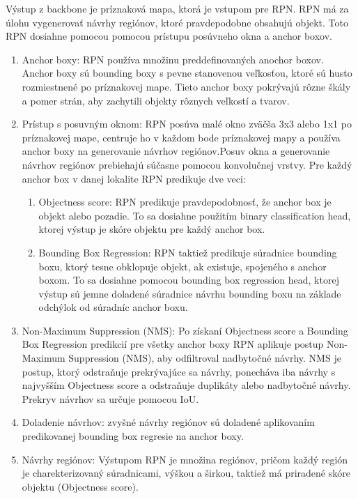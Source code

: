 Výstup z backbone je príznaková mapa, ktorá je vstupom pre RPN. RPN má za úlohu vygenerovať návrhy regiónov, ktoré pravdepodobne obsahujú objekt. Toto RPN dosiahne pomocou pomocou prístupu posúvneho okna a anchor boxov.
\begin{enumerate}
  \item Anchor boxy: RPN používa množinu preddefinovaných anochor boxov. Anchor boxy sú bounding boxy s pevne stanovenou veľkosťou, ktoré sú husto rozmiestnené po príznakovej mape. Tieto anchor boxy pokrývajú rôzne škály a pomer strán, aby zachytili objekty rôznych veľkostí a tvarov. 
  \item Prístup s posuvným oknom: RPN posúva malé okno zväčša 3x3 alebo 1x1 po príznakovej mape, centruje ho v každom bode príznakovej mapy a používa anchor boxy na generovanie návrhov regiónov.Posuv okna a generovanie návrhov regiónov prebiehajú súčasne pomocou konvolučnej vrstvy. Pre každý anchor box v danej lokalite RPN predikuje dve veci: 
  \begin{enumerate}
  \item Objectness score: RPN predikuje pravdepodobnosť, že anchor box je objekt alebo pozadie. To sa dosiahne použitím binary classification head, ktorej výstup je skóre objektu pre každý anchor box.
  \item Bounding Box Regression: RPN taktiež predikuje súradnice bounding boxu, ktorý tesne obklopuje objekt, ak existuje, spojeného s anchor boxom. To sa dosiahne pomocou bounding box regression head, ktorej výstup sú jemne doladené súradnice návrhu bounding boxu na základe odchýlok od súradníc anchor boxu.
  \end{enumerate}
  \item Non-Maximum Suppression (NMS): Po získaní Objectness score a Bounding Box Regression predikcií pre všetky anchor boxy RPN aplikuje postup Non-Maximum Suppression (NMS), aby odfiltroval nadbytočné návrhy. NMS je postup, ktorý odstraňuje prekrývajúce sa návrhy, ponecháva iba návrhy s najvyšším Objectness score a odstraňuje duplikáty alebo nadbytočné návrhy. Prekryv návrhov sa určuje pomocou IoU.
  \item Doladenie návrhov: zvyšné návrhy regiónov sú doladené aplikovaním predikovanej bounding box regresie na anchor boxy.  
  \item Návrhy regiónov: Výstupom RPN je množina regiónov, pričom každý región je charekterizovaný súradnicami, výškou a širkou, taktiež má priradené skóre objektu (Objectness score).
\end{enumerate}

